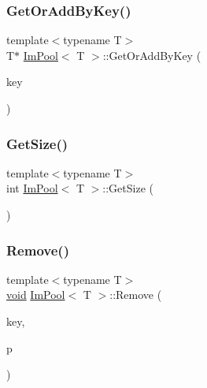 \mbox{\label{structImPool_a564fd757c33978601849a6091dcd99a0}} 
\subsubsection{\texorpdfstring{Get\+Or\+Add\+By\+Key()}{GetOrAddByKey()}}
{\footnotesize\ttfamily template$<$typename T$>$ \\
T$\ast$ \hyperlink{structImPool}{Im\+Pool}$<$ T $>$\+::Get\+Or\+Add\+By\+Key (\begin{DoxyParamCaption}\item[{Im\+Gui\+ID}]{key }\end{DoxyParamCaption})\hspace{0.3cm}{\ttfamily [inline]}}

\mbox{\label{structImPool_ae71be921586613e7676b1085b5e5676f}} 
\subsubsection{\texorpdfstring{Get\+Size()}{GetSize()}}
{\footnotesize\ttfamily template$<$typename T$>$ \\
int \hyperlink{structImPool}{Im\+Pool}$<$ T $>$\+::Get\+Size (\begin{DoxyParamCaption}{ }\end{DoxyParamCaption})\hspace{0.3cm}{\ttfamily [inline]}}

\mbox{\label{structImPool_a7b2c095ea540dc8afb670e705a37a912}} 
\subsubsection{\texorpdfstring{Remove()}{Remove()}\hspace{0.1cm}{\footnotesize\ttfamily [1/2]}}
{\footnotesize\ttfamily template$<$typename T$>$ \\
\hyperlink{imgui__impl__opengl3__loader_8h_ac668e7cffd9e2e9cfee428b9b2f34fa7}{void} \hyperlink{structImPool}{Im\+Pool}$<$ T $>$\+::Remove (\begin{DoxyParamCaption}\item[{Im\+Gui\+ID}]{key,  }\item[{const T $\ast$}]{p }\end{DoxyParamCaption})\hspace{0.3cm}{\ttfamily [inline]}}

